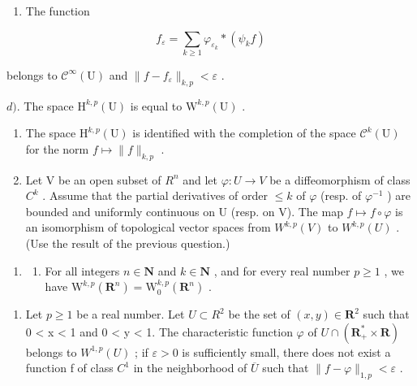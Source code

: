 \begin{enumerate}
\def\labelenumi{\alph{enumi})}
\setcounter{enumi}{2}
\tightlist
\item
  The function
\end{enumerate}

\[
f _ {\varepsilon} = \sum_ {k \geqslant 1} \varphi_ {\varepsilon_ {k}} * (\psi_ {k} f)
\]

belongs to \(\mathcal{C}^{\infty}(\mathrm{U})\) and \(\| f - f_{\varepsilon}\|_{k,p} < \varepsilon\) .

\(d)\). The space \(\mathrm{H}^{k,p}(\mathrm{U})\) is equal to \(\mathrm{W}^{k,p}(\mathrm{U})\) .

\begin{enumerate}
\def\labelenumi{\alph{enumi})}
\setcounter{enumi}{4}
\item
  The space \(\mathrm{H}^{k,p}(\mathrm{U})\) is identified with the completion of the space \(\mathcal{C}^{k}(\mathrm{U})\) for the norm \(f \mapsto \|f\|_{k,p}\) .
\item
  Let V be an open subset of \(R^{n}\) and let \(\varphi\colon U\to V\) be a diffeomorphism of class \(C^{k}\) . Assume that the partial derivatives of order \(\leqslant k\) of \(\varphi\) (resp. of \(\varphi^{-1}\) ) are bounded and uniformly continuous on U (resp. on V). The map \(f\mapsto f\circ\varphi\) is an isomorphism of topological vector spaces from \(W^{k,p}(V)\) to \(W^{k,p}(U)\) . (Use the result of the previous question.)
\end{enumerate}

\begin{enumerate}
\def\labelenumi{\arabic{enumi})}
\setcounter{enumi}{11}
\tightlist
\item
  \begin{enumerate}
  \def\labelenumii{\alph{enumii})}
  \tightlist
  \item
    For all integers \(n \in \mathbf{N}\) and \(k \in \mathbf{N}\) , and for every real number \(p \geqslant 1\) , we have \(\mathrm{W}^{k,p}(\mathbf{R}^n) = \mathrm{W}_0^{k,p}(\mathbf{R}^n)\) .
  \end{enumerate}
\end{enumerate}

\begin{enumerate}
\def\labelenumi{\alph{enumi})}
\setcounter{enumi}{1}
\tightlist
\item
  Let \(p \geqslant 1\) be a real number. Let \(U \subset R^{2}\) be the set of \((x, y) \in \mathbf{R}^{2}\) such that 0 \textless{} \textbar x\textbar{} \textless{} 1 and 0 \textless{} y \textless{} 1. The characteristic function \(\varphi\) of \(U \cap (\mathbf{R}_{+}^{*} \times \mathbf{R})\) belongs to \(W^{1,p}(U)\) ; if \(\varepsilon > 0\) is sufficiently small, there does not exist a function f of class \(C^{1}\) in the neighborhood of \(\overline{U}\) such that \(\|f - \varphi\|_{1,p} < \varepsilon\) .
\end{enumerate}

